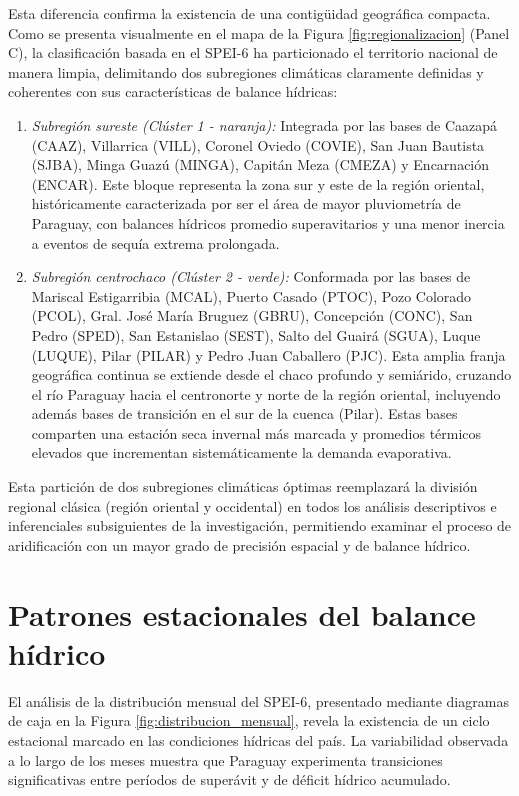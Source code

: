 Esta diferencia confirma la existencia de una contigüidad geográfica compacta. Como se presenta visualmente en el mapa de la Figura \ref{fig:regionalizacion} (Panel C), la clasificación basada en el SPEI-6 ha particionado el territorio nacional de manera limpia, delimitando dos subregiones climáticas claramente definidas y coherentes con sus características de balance hídricas:

\begin{enumerate}
    \item \textit{Subregión sureste (Clúster 1 - naranja):} Integrada por las bases de Caazapá (CAAZ), Villarrica (VILL), Coronel Oviedo (COVIE), San Juan Bautista (SJBA), Minga Guazú (MINGA), Capitán Meza (CMEZA) y Encarnación (ENCAR). Este bloque representa la zona sur y este de la región oriental, históricamente caracterizada por ser el área de mayor pluviometría de Paraguay, con balances hídricos promedio superavitarios y una menor inercia a eventos de sequía extrema prolongada.
    \item \textit{Subregión centrochaco (Clúster 2 - verde):} Conformada por las bases de Mariscal Estigarribia (MCAL), Puerto Casado (PTOC), Pozo Colorado (PCOL), Gral. José María Bruguez (GBRU), Concepción (CONC), San Pedro (SPED), San Estanislao (SEST), Salto del Guairá (SGUA), Luque (LUQUE), Pilar (PILAR) y Pedro Juan Caballero (PJC). Esta amplia franja geográfica continua se extiende desde el chaco profundo y semiárido, cruzando el río Paraguay hacia el centronorte y norte de la región oriental, incluyendo además bases de transición en el sur de la cuenca (Pilar). Estas bases comparten una estación seca invernal más marcada y promedios térmicos elevados que incrementan sistemáticamente la demanda evaporativa.
\end{enumerate}

Esta partición de dos subregiones climáticas óptimas reemplazará la división regional clásica (región oriental y occidental) en todos los análisis descriptivos e inferenciales subsiguientes de la investigación, permitiendo examinar el proceso de aridificación con un mayor grado de precisión espacial y de balance hídrico.

\section{Patrones estacionales del balance hídrico}

El análisis de la distribución mensual del SPEI-6, presentado mediante diagramas de caja en la Figura \ref{fig:distribucion_mensual}, revela la existencia de un ciclo estacional marcado en las condiciones hídricas del país. La variabilidad observada a lo largo de los meses muestra que Paraguay experimenta transiciones significativas entre períodos de superávit y de déficit hídrico acumulado.

